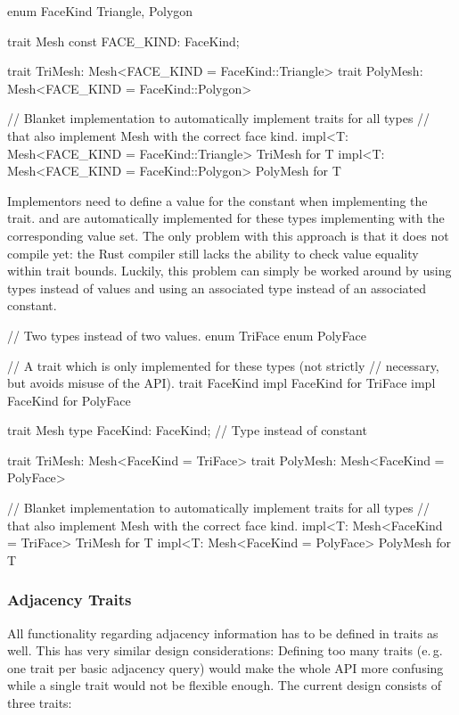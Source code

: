 \begin{rustcode}
  enum FaceKind { Triangle, Polygon }

  trait Mesh {
      const FACE_KIND: FaceKind;
  }

  trait TriMesh: Mesh<FACE_KIND = FaceKind::Triangle> {}
  trait PolyMesh: Mesh<FACE_KIND = FaceKind::Polygon> {}

  // Blanket implementation to automatically implement traits for all types
  // that also implement Mesh with the correct face kind.
  impl<T: Mesh<FACE_KIND = FaceKind::Triangle> TriMesh for T {}
  impl<T: Mesh<FACE_KIND = FaceKind::Polygon> PolyMesh for T {}
\end{rustcode}

Implementors need to define a value for the constant when implementing the trait.
 and  are automatically implemented for these types implementing  with the corresponding value set.
The only problem with this approach is that it does not compile yet:
the Rust compiler still lacks the ability to check value equality within trait bounds.
Luckily, this problem can simply be worked around by using types instead of values and using an associated type instead of an associated constant.

\begin{rustcode}
  // Two types instead of two values.
  enum TriFace {}
  enum PolyFace {}

  // A trait which is only implemented for these types (not strictly
  // necessary, but avoids misuse of the API).
  trait FaceKind {}
  impl FaceKind for TriFace {}
  impl FaceKind for PolyFace {}

  trait Mesh {
      type FaceKind: FaceKind;  // Type instead of constant
  }

  trait TriMesh: Mesh<FaceKind = TriFace> {}
  trait PolyMesh: Mesh<FaceKind = PolyFace> {}

  // Blanket implementation to automatically implement traits for all types
  // that also implement Mesh with the correct face kind.
  impl<T: Mesh<FaceKind = TriFace> TriMesh for T {}
  impl<T: Mesh<FaceKind = PolyFace> PolyMesh for T {}
\end{rustcode}


\subsubsection*{Adjacency Traits}

All functionality regarding adjacency information has to be defined in traits as well.
This has very similar design considerations:
Defining too many traits (e.\,g. one trait per basic adjacency query) would make the whole API more confusing while a single trait would not be flexible enough.
The current design consists of three traits:


